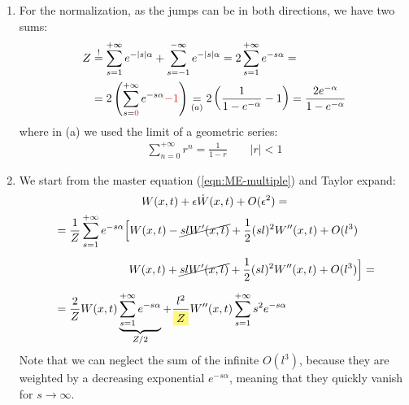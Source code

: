 \documentclass[../template.tex]{subfiles}
\begin{document}
\begin{exo}
    \begin{enumerate}
        \item For the normalization, as the jumps can be in both directions, we have two sums:
        \begin{align*}
            Z &\overset{!}{=}  \sum_{s = 1}^{+\infty} e^{-|s| \alpha} + \sum_{s=-1}^{-\infty} e^{-|s| \alpha} = 2 \sum_{s=1}^{+\infty} e^{-s \alpha} =\\
            &= 2\left(\sum_{s=\textcolor{Red}{0}}^{+\infty} e^{-s \alpha} \textcolor{Red}{- 1}\right) \underset{(a)}{=} 2 \left(\frac{1}{1-e^{-\alpha}}  - 1\right) = \frac{2 e^{-\alpha}}{1 - e^{-\alpha}} 
        \end{align*}
        where in (a) we used the limit of a geometric series:
        \begin{align*}
            \sum_{n = 0}^{+\infty} r^{n} = \frac{1}{1-r} \qquad |r| < 1 
        \end{align*}
        \item We start from the master equation (\ref{eqn:ME-multiple}) and Taylor expand:
        \begin{align} \nonumber
            W(x,t) + \epsilon \dot{W}(x,t) + O(\epsilon^2) = \span \\ \nonumber &= \frac{1}{Z} \sum_{s=1}^{+\infty} e^{-s \alpha}\Big[W(x,t) -\cancel{sl W'(x,t)} + \frac{1}{2} (sl)^2 W''(x,t) + O(l^3) \\ \nonumber
            &\phantom{\> = \frac{1}{Z} \sum_{s=1}^{+\infty} e^{-s \alpha} \Big[}W(x,t) + \cancel{sl W'(x,t)} +\frac{1}{2}(sl)^2 W''(x,t) + O(l^3) \Big] =\\
            &= \frac{2}{Z} W(x,t) \underbrace{\sum_{s=1}^{+\infty} e^{-s \alpha}}_{Z/2}  + \frac{l^2}{\hlc{Yellow}{Z} } W''(x,t) \sum_{s=1}^{+\infty} s^2 e^{-s \alpha} \label{eqn:continuum-multiple}
        \end{align}
        Note that we can neglect the sum of the infinite $O(l^3)$, because they are weighted by a decreasing exponential $e^{-s \alpha}$, meaning that they quickly vanish for $s \to \infty$.


\end{enumerate}
\end{exo}
\end{document}
